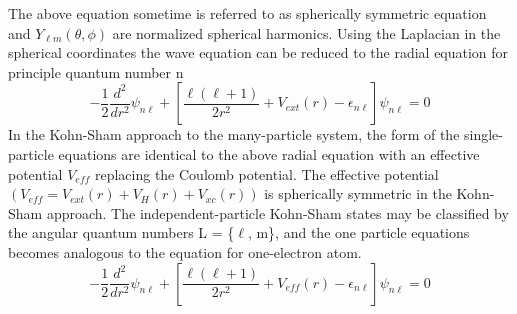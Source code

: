 

The above equation sometime is referred to as spherically symmetric \schrod equation and $Y_{\ell m}(\theta, \phi)$ are normalized spherical harmonics. Using the Laplacian in the spherical coordinates the wave equation can be reduced to the radial equation for principle quantum number n
\begin{equation}
\label{eq_radial}
-\frac{1}{2}\frac{d^2}{dr^2} \psi_{n\ell} + \left [ \frac{\ell(\ell+1)}{2r^2} + V_{ext}(r) - \epsilon_{n\ell} \right ] \psi_{n\ell} = 0
\end{equation}
In the Kohn-Sham approach to the many-particle system, the form of the single-particle equations are identical to the above radial \schrod equation with an effective potential $V_{eff}$ replacing the Coulomb potential. The effective potential $(V_{eff} = V_{ext}(r) + V_{H} (r) + V_{xc} (r))$ is spherically symmetric in the Kohn-Sham approach. The independent-particle Kohn-Sham states may be classified by the angular quantum numbers L = \{$\ell$, m\}, and the one particle equations becomes analogous to the \schrod equation for one-electron atom. 
\begin{equation}
\label{eq_oneparticle}
-\frac{1}{2}\frac{d^2}{dr^2} \psi_{n\ell} + \left [ \frac{\ell(\ell+1)}{2r^2} + V_{eff}(r) - \epsilon_{n\ell} \right ] \psi_{n\ell} = 0
\end{equation}

